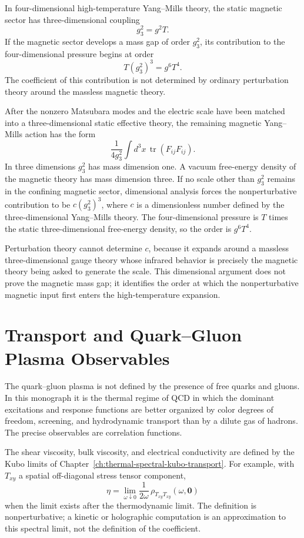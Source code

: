 \begin{remark}
\label{rem:qcd-linde-scale}
In four-dimensional high-temperature Yang--Mills theory, the static magnetic
sector has three-dimensional coupling
\[
  g_3^2=g^2T .
\]
If the magnetic sector develops a mass gap of order \(g_3^2\), its
contribution to the four-dimensional pressure begins at order
\[
  T(g_3^2)^3 = g^6T^4 .
\]
The coefficient of this contribution is not determined by ordinary
perturbation theory around the massless magnetic theory.

After the nonzero Matsubara modes and the electric scale have been matched
into a three-dimensional static effective theory, the remaining magnetic
Yang--Mills action has the form
\[
  \frac1{4g_3^2}\int d^3x\,\operatorname{tr}(F_{ij}F_{ij}).
\]
In three dimensions \(g_3^2\) has mass dimension one.  A vacuum free-energy
density of the magnetic theory has mass dimension three.  If no scale other
than \(g_3^2\) remains in the confining magnetic sector, dimensional analysis
forces the nonperturbative contribution to be \(c(g_3^2)^3\), where \(c\) is
a dimensionless number defined by the three-dimensional Yang--Mills theory.
The four-dimensional pressure is \(T\) times the static three-dimensional
free-energy density, so the order is \(g^6T^4\).

Perturbation theory cannot determine \(c\), because it expands around a
massless three-dimensional gauge theory whose infrared behavior is precisely
the magnetic theory being asked to generate the scale.  This dimensional
argument does not prove the magnetic mass gap; it identifies the order at which the
nonperturbative magnetic input first enters the high-temperature expansion.
\end{remark}

\section{Transport and Quark--Gluon Plasma Observables}

The quark--gluon plasma is not defined by the presence of free quarks and
gluons.  In this monograph it is the thermal regime of QCD in which the
dominant excitations and response functions are better organized by color
degrees of freedom, screening, and hydrodynamic transport than by a dilute
gas of hadrons.  The precise observables are correlation functions.

The shear viscosity, bulk viscosity, and electrical conductivity are defined
by the Kubo limits of Chapter~\ref{ch:thermal-spectral-kubo-transport}.  For
example, with \(T_{xy}\) a spatial off-diagonal stress tensor component,
\[
  \eta
  =
  \lim_{\omega\downarrow0}
  \frac{1}{2\omega}\,
  \rho_{T_{xy}T_{xy}}(\omega,\mathbf0)
\]
when the limit exists after the thermodynamic limit.  The definition is
nonperturbative; a kinetic or holographic computation is an approximation to
this spectral limit, not the definition of the coefficient.

